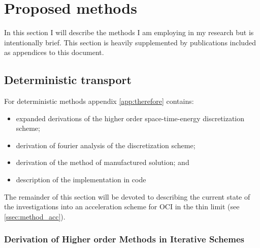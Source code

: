 \chapter{Proposed methods}
\label{ch:methods}

In this section I will describe the methods I am employing in my research but is intentionally brief.
This section is heavily supplemented by publications included as appendices to this document.

\section{Deterministic transport}

For deterministic methods appendix \ref{app:therefore} contains:
\begin{itemize}
    \item expanded derivations of the higher order space-time-energy discretization scheme;
    \item derivation of fourier analysis of the discretization scheme;
    \item derivation of the method of manufactured solution; and
    \item description of the implementation in code
\end{itemize}
The remainder of this section will be devoted to describing the current state of the investigations into an acceleration scheme for OCI in the thin limit (see \ref{ssec:method_acc}).

\subsection{Derivation of Higher order Methods in Iterative Schemes}

